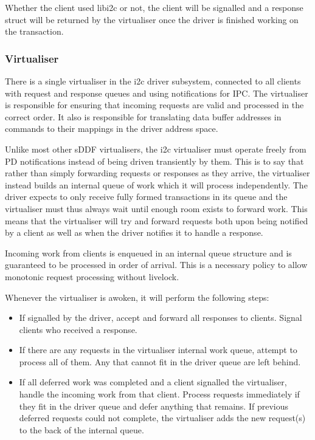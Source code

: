 \documentclass[a4paper,12pt]{report}
\begin{document}
Whether the client used libi2c or not, the client will be signalled and a response struct
will be returned by the virtualiser once the driver is finished working on the transaction.

\subsubsection{Virtualiser}

There is a single virtualiser in the \gls{i2c} driver subsystem, connected to all clients
with request and response queues and using notifications for IPC. The virtualiser is
responsible for ensuring that incoming requests are valid and processed in the correct order.
It also is responsible for translating data buffer addresses in commands to their
mappings in the driver address space.

Unlike most other sDDF virtualisers, the \gls{i2c} virtualiser must operate freely
from PD notifications instead of being driven transiently by them. This is to say that
rather than simply forwarding requests or responses as they arrive, the virtualiser instead
builds an internal queue of work which it will process independently. The driver expects to
only receive fully formed transactions in its queue and the virtualiser must thus always wait
until enough room exists to forward work. This means that the virtualiser will try and forward
requests both upon being notified by a client as well as when the driver notifies it to handle
a response.

Incoming work from clients is enqueued in an internal queue structure
and is guaranteed to be processed in order of arrival. This is a necessary policy to
allow monotonic request processing without livelock.

Whenever the virtualiser is awoken, it will perform the following steps:
\begin{itemize}
  \item If signalled by the driver, accept and forward all responses to clients. Signal
    clients who received a response.
  \item If there are any requests in the virtualiser internal work queue, attempt to process
    all of them. Any that cannot fit in the driver queue are left behind.
  \item If all deferred work was completed and a client signalled the virtualiser, handle the
    incoming work from that client. Process requests immediately if they fit in the driver queue
    and defer anything that remains. If previous deferred requests could not complete,
    the virtualiser adds the new request(s) to the back of the internal queue.
\end{itemize}
\end{document}
